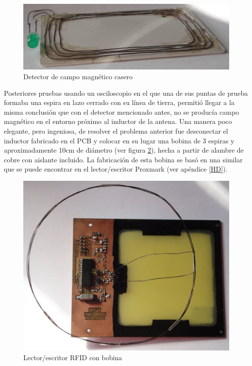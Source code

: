 \begin{figure}[H]
\centering
  \begin{center}
  \includegraphics[scale=.1]{Imagenes/detector.jpg}
  \end{center}
  \caption{Detector de campo magnético casero}\label{Fig:detector} 
\end{figure}


Posteriores pruebas usando un osciloscopio en el que una de sus puntas de prueba formaba una espira en lazo cerrado con su línea de tierra, permitió llegar a la misma conclusión que con el detector mencionado antes, no se producía campo magnético en el entorno próximo al inductor de la antena.  
Una manera poco elegante, pero ingeniosa, de resolver el problema anterior fue desconectar el inductor fabricado en el PCB y colocar en su lugar una bobina de 3 espiras y aproximadamente 10cm de diámetro (ver figura \ref{ant_rulo}), hecha a partir de alambre de cobre con aislante incluido. La fabricación de esta bobina se basó en una similar que se puede encontrar en el lector/escritor Proxmark \cite{Proxmark} (ver apéndice \ref{HD}). 

\begin{figure}[H]
\centering
  \begin{center}
  \includegraphics[scale=.1]{Imagenes/ant_rulo.jpg}
  \end{center}
  \caption{Lector/escritor RFID con bobina}\label{ant_rulo} 
\end{figure}

